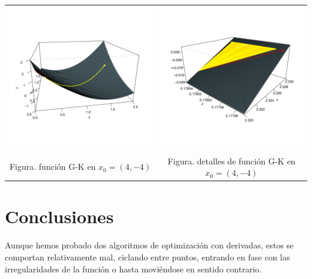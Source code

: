 \documentclass[10pt]{article}
\theoremstyle{definition}
\begin{document}
\vspace{-4em}
\begin{table}[H]\centering
\begin{tabular}{cc}
\includegraphics[width=0.4\linewidth]{../graphs/gregory_fun/newt/newt1.pdf}
&
\includegraphics[width=0.4\linewidth]{../graphs/gregory_fun/newt/newt2.pdf}\\[-3em]
Figura. {\small función G-K en $x_0=(4,-4)$}&
Figura. {\small detalles de función G-K en $x_0=(4,-4)$}\\
\end{tabular}
\end{table}


\section{Conclusiones}
Aunque hemos probado dos algoritmos de optimización con derivadas, estos se 
comportan relativamente mal, ciclando entre puntos, entrando en fase con las
irregularidades de la función o hasta moviéndose en sentido contrario.
\end{document}

